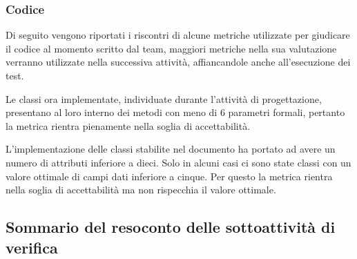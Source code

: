\documentclass[a4paper, titlepage]{article}
\begin{document}
\subsubsection{Codice}
Di seguito vengono riportati i riscontri di alcune metriche utilizzate per giudicare il codice al momento scritto dal team, maggiori metriche nella sua valutazione verranno utilizzate nella successiva attività, affiancandole anche all'esecuzione dei test.

Le classi ora implementate, individuate durante l'attività di progettazione, presentano al loro interno dei metodi con meno di 6 parametri formali, pertanto la metrica rientra pienamente nella soglia di accettabilità.

L'implementazione delle classi stabilite nel documento  ha portato ad avere un numero di attributi inferiore a dieci. Solo in alcuni casi ci sono state classi con un valore ottimale di campi dati inferiore a cinque. Per questo la metrica rientra nella soglia di accettabilità ma non rispecchia il valore ottimale.

\subsection {Sommario del resoconto delle sottoattività di verifica}
\end{document}
